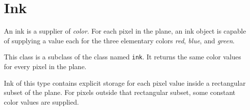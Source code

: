 \chapter{Ink}
\label{chap-ink}


An ink is a supplier of \emph{color}.  For each pixel in the plane, an
ink object is capable of supplying a value each for the three
elementary colors \emph{red}, \emph{blue}, and \emph{green}.


This class is a subclass of the class named \texttt{ink}.  It returns
the same color values for every pixel in the plane.


Ink of this type contains explicit storage for each pixel value inside
a rectangular subset of the plane.  For pixels outside that
rectangular subset, some constant color values are supplied.

